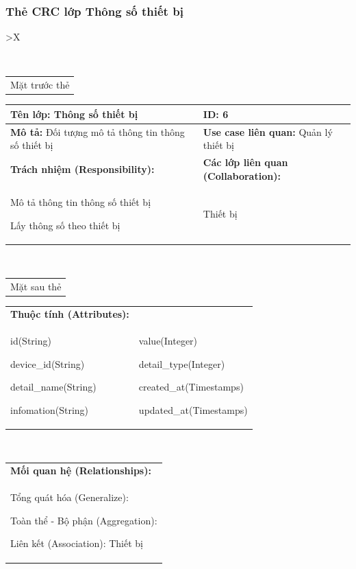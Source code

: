   \subsubsection{Thẻ CRC lớp Thông số thiết bị}
  \begin{xltabular}{\textwidth}{
    >{\centering\arraybackslash}X 
  }
  \caption{\bfseries \fontsize{12pt}{0pt}\selectfont Thẻ CRC lớp Thông số thiết bị}
  \\
  \begin{tabularx}{0.9\textwidth}{X}
    Mặt trước thẻ
  \end{tabularx}
  \begin{tabularx}{0.9\textwidth}{|X|X|}
    \hline
    \textbf{Tên lớp:} Thông số thiết bị & \textbf{ID:} 6 \\
    \hline
    \textbf{Mô tả:} Đối tượng mô tả thông tin thông số thiết bị & \textbf{Use case liên quan:} Quản lý thiết bị\\
    \hline
    \textbf{Trách nhiệm (Responsibility):} & \textbf{Các lớp liên quan (Collaboration):} \\
    Mô tả thông tin thông số thiết bị

    Lấy thông số theo thiết bị
    & 
    Thiết bị 
    \\
    \hline
  \end{tabularx}
  \\ 
  \begin{tabularx}{0.9\textwidth}{X}
    Mặt sau thẻ
  \end{tabularx} 
  \begin{tabularx}{0.9\textwidth}{|X|X|}
    \hline
    \textbf{Thuộc tính (Attributes):} & \\
    id(String) 
    
    device\_id(String)

    detail\_name(String)

    infomation(String)
    & 
    value(Integer)

    detail\_type(Integer)
    
    created\_at(Timestamps)

    updated\_at(Timestamps)
    \\
    \hline
  \end{tabularx}
  \\     
  \begin{tabularx}{0.9\textwidth}{|X|}
    \textbf{Mối quan hệ (Relationships):} \\
    Tổng quát hóa (Generalize):  

    Toàn thể - Bộ phận (Aggregation): 
    
    Liên kết (Association): Thiết bị
    \\
    \hline
  \end{tabularx}
  \end{xltabular}

